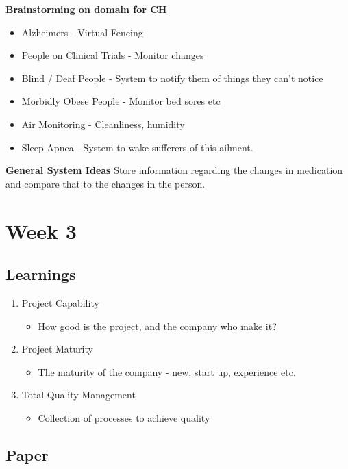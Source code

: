 \textbf{Brainstorming on domain for CH}
\begin{itemize}
\item Alzheimers - Virtual Fencing
\item People on Clinical Trials - Monitor changes
\item Blind / Deaf People - System to notify them of things they can't notice
\item Morbidly Obese People - Monitor bed sores etc
\item Air Monitoring - Cleanliness, humidity
\item Sleep Apnea - System to wake sufferers of this ailment.
\end{itemize}

\textbf{General System Ideas}\newline \newline
Store information regarding the changes in medication and compare that to the changes in the person.
\chapter{Week 3}

\section{Learnings}
\begin{enumerate}
\item Project Capability
\begin{itemize}
\item How good is the project, and the company who make it?
\end{itemize}
\item Project Maturity
\begin{itemize}
\item The maturity of the company - new, start up, experience etc.
\end{itemize}
\item Total Quality Management
\begin{itemize}
\item Collection of processes to achieve quality
\end{itemize}
\end{enumerate}

\section{Paper}

